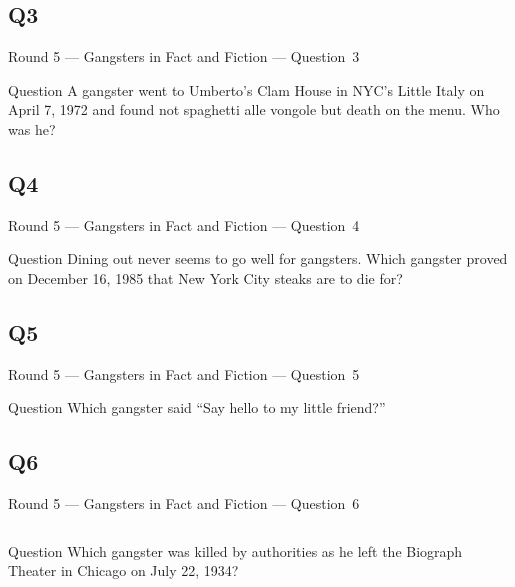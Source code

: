 \documentclass[11pt]{beamer}
\begin{document}
\subsection*{Q3}
\begin{frame}[t]{Round 5 --- Gangsters in Fact and Fiction --- \mbox{Question 3}}
\begin{block}{Question}
A gangster went to Umberto's Clam House in NYC's Little Italy on April 7, 1972 and found not spaghetti alle vongole but death on the menu.  Who was he?
\end{block}
\end{frame}
\subsection*{Q4}
\begin{frame}[t]{Round 5 --- Gangsters in Fact and Fiction --- \mbox{Question 4}}
\begin{block}{Question}
Dining out never seems to go well for gangsters. Which gangster proved on December 16, 1985 that New York City steaks are to die for?
\end{block}
\end{frame}
\subsection*{Q5}
\begin{frame}[t]{Round 5 --- Gangsters in Fact and Fiction --- \mbox{Question 5}}
\begin{block}{Question}
Which gangster said ``Say hello to my little friend?''
\end{block}
\end{frame}
\subsection*{Q6}
\begin{frame}[t]{Round 5 --- Gangsters in Fact and Fiction --- \mbox{Question 6}}
\begin{columns}[T,totalwidth=\linewidth]
\begin{column}{0.32\linewidth}
\begin{block}{Question}
Which gangster was killed by authorities as he left the Biograph Theater in Chicago on July 22, 1934?
\end{block}
\end{column}
\begin{column}{0.65\linewidth}
\begin{center}
\texttt{[image: \{Images/biograph]}.jpg}
\end{center}
\end{column}
\end{columns}
\end{frame}
\end{document}
